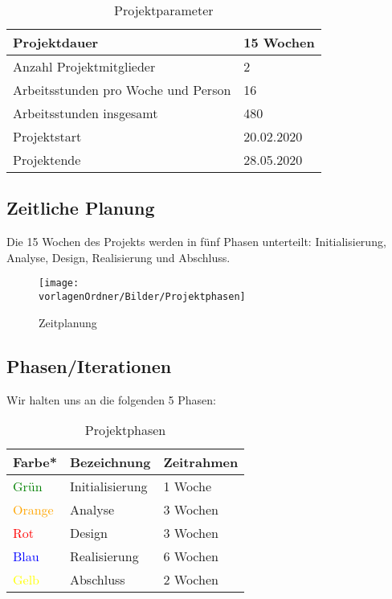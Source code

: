 \documentclass[
	ngerman,
	toc=listof, %
	toc=bibliography, %
	footnotes=multiple, %
	parskip=half, %
	numbers=noendperiod %
]{scrartcl}
\newcommand{\vorlagenOrdner}{../../99_Vorlagen} %
\begin{document}
		\begin{table}[!h]
			\begin{tabularx}{\textwidth}{Xl}
				\midrule
				Projektdauer & 15 Wochen \\
				\midrule
				Anzahl Projektmitglieder & 2 \\
				\midrule
				Arbeitsstunden pro Woche und Person & 16 \\
				\midrule
				Arbeitsstunden insgesamt & 480 \\
				\midrule
				Projektstart & 20.02.2020 \\
				\midrule
				Projektende & 28.05.2020 \\
				\midrule
			\end{tabularx}
			\caption{Projektparameter}
		\end{table}

	\subsection{Zeitliche Planung}
		Die 15 Wochen des Projekts werden in fünf Phasen unterteilt: Initialisierung, Analyse, Design, Realisierung und Abschluss.\\
		\begin{figure}[!h]
			\begin{center}
				\label{ZeitplanOverview}
				\texttt{[image: \\vorlagenOrdner/Bilder/Projektphasen]}
			\end{center}
			\caption{Zeitplanung}
		\end{figure}

	\subsection{Phasen/Iterationen}
		Wir halten uns an die folgenden 5 Phasen: 

		\begin{table}[!h]
			\begin{tabularx}{\textwidth}{lll}
				\toprule
				Farbe* & Bezeichnung & Zeitrahmen \\
				\midrule
				\textcolor{green}{Grün} & Initialisierung & 1 Woche \\
				\textcolor{orange}{Orange} & Analyse & 3 Wochen \\
				\textcolor{red}{Rot} & Design & 3 Wochen \\
				\textcolor{blue}{Blau} & Realisierung & 6 Wochen \\
				\textcolor{yellow}{Gelb} & Abschluss & 2 Wochen \\
				\bottomrule
			\end{tabularx}
			\caption{Projektphasen}
		\end{table}
\end{document}
